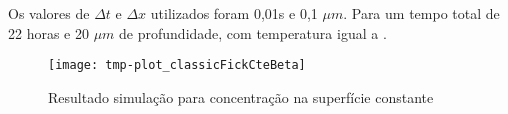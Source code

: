 Os valores de $\Delta t$ e $\Delta x$ utilizados foram 0,01s e 0,1 $\mu m$. Para um tempo total de 22 horas e 20 $\mu m$ de profundidade, com temperatura igual a .



\begin{figure}[ht]
\centering
	\caption{Resultado simulação para concentração na superfície constante }
	\texttt{[image: tmp-plot\_classicFickCteBeta]}
	\label{fig:csvar-gas}
	\centering
\end{figure}


